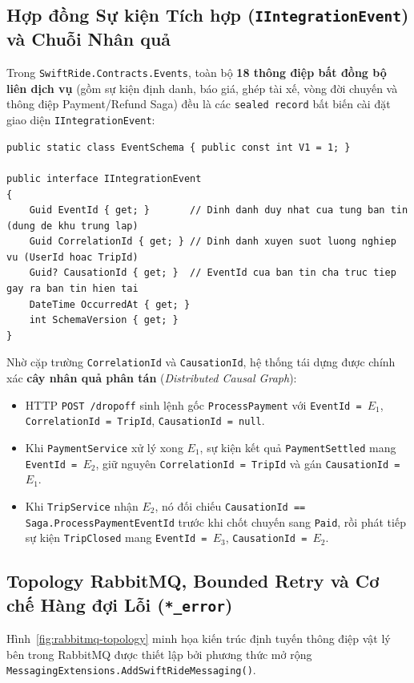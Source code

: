 \documentclass[12pt,a4paper]{article}
\begin{document}
\subsection{Hợp đồng Sự kiện Tích hợp (\texttt{IIntegrationEvent}) và Chuỗi Nhân quả}
Trong \texttt{SwiftRide.Contracts.Events}, toàn bộ \textbf{18 thông điệp bất đồng bộ liên dịch vụ} (gồm sự kiện định danh, báo giá, ghép tài xế, vòng đời chuyến và thông điệp Payment/Refund Saga) đều là các \texttt{sealed record} bất biến cài đặt giao diện \texttt{IIntegrationEvent}:
\begin{lstlisting}[caption={Hop dong metadata chuan hoa IIntegrationEvent trong SwiftRide.Contracts}]
public static class EventSchema { public const int V1 = 1; }

public interface IIntegrationEvent
{
    Guid EventId { get; }       // Dinh danh duy nhat cua tung ban tin (dung de khu trung lap)
    Guid CorrelationId { get; } // Dinh danh xuyen suot luong nghiep vu (UserId hoac TripId)
    Guid? CausationId { get; }  // EventId cua ban tin cha truc tiep gay ra ban tin hien tai
    DateTime OccurredAt { get; }
    int SchemaVersion { get; }
}
\end{lstlisting}

Nhờ cặp trường \texttt{CorrelationId} và \texttt{CausationId}, hệ thống tái dựng được chính xác \textbf{cây nhân quả phân tán} (\textit{Distributed Causal Graph}):
\begin{itemize}[nosep]
    \item HTTP \texttt{POST /dropoff} sinh lệnh gốc \texttt{ProcessPayment} với \texttt{EventId = }$E_1$, \texttt{CorrelationId = TripId}, \texttt{CausationId = null}.
    \item Khi \texttt{PaymentService} xử lý xong $E_1$, sự kiện kết quả \texttt{PaymentSettled} mang \texttt{EventId = }$E_2$, giữ nguyên \texttt{CorrelationId = TripId} và gán \texttt{CausationId = }$E_1$.
    \item Khi \texttt{TripService} nhận $E_2$, nó đối chiếu \texttt{CausationId == Saga.ProcessPaymentEventId} trước khi chốt chuyến sang \texttt{Paid}, rồi phát tiếp sự kiện \texttt{TripClosed} mang \texttt{EventId = }$E_3$, \texttt{CausationId = }$E_2$.
\end{itemize}

\subsection{Topology RabbitMQ, Bounded Retry và Cơ chế Hàng đợi Lỗi (\texttt{*\_error})}
Hình~\ref{fig:rabbitmq-topology} minh họa kiến trúc định tuyến thông điệp vật lý bên trong RabbitMQ được thiết lập bởi phương thức mở rộng \texttt{MessagingExtensions.AddSwiftRideMessaging()}.
\end{document}
